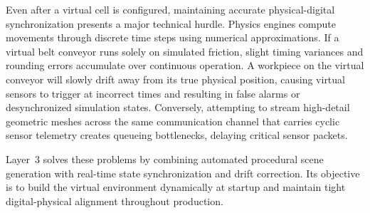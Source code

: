 Even after a virtual cell is configured, maintaining accurate physical-digital synchronization presents a major technical hurdle. Physics engines compute movements through discrete time steps using numerical approximations. If a virtual belt conveyor runs solely on simulated friction, slight timing variances and rounding errors accumulate over continuous operation. A workpiece on the virtual conveyor will slowly drift away from its true physical position, causing virtual sensors to trigger at incorrect times and resulting in false alarms or desynchronized simulation states. Conversely, attempting to stream high-detail geometric meshes across the same communication channel that carries cyclic sensor telemetry creates queueing bottlenecks, delaying critical sensor packets.

Layer~3 solves these problems by combining automated procedural scene generation with real-time state synchronization and drift correction. Its objective is to build the virtual environment dynamically at startup and maintain tight digital-physical alignment throughout production.

